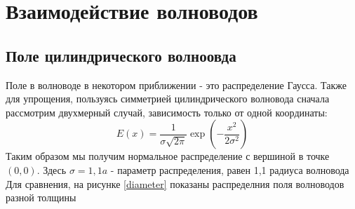 \chapter{Взаимодействие волноводов}
\section{Поле цилиндрического волноовда}
Поле в волноводе в некотором приближении - это распределение Гаусса. Также для упрощения, пользуясь симметрией цилиндрического волновода сначала рассмотрим двухмерный случай, зависимость только от одной координаты:
\begin{equation}
  \label{gauss}
  E(x)=\frac{1}{\sigma\sqrt{2\pi}}\exp\left(-\frac{x^2}{2\sigma^2}\right)
\end{equation}
Таким образом мы получим нормальное распределение с вершиной в точке $(0,0)$.
Здесь $\sigma = 1,1a$ - параметр распределения, равен 1,1 радиуса волновода
Для сравнения, на рисунке \ref{diameter} показаны распределния поля волноводов разной толщины

